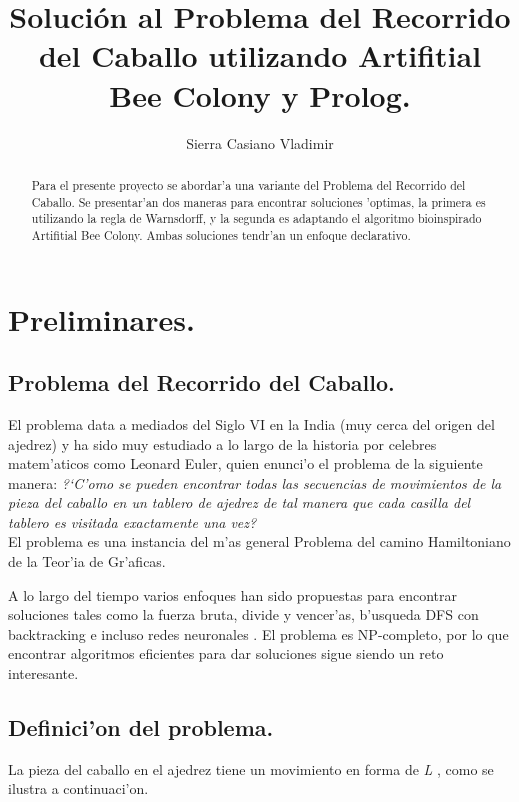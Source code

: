 \documentclass[12pt]{article}
\title{Solución al Problema del Recorrido del Caballo
    utilizando Artifitial Bee Colony y Prolog.}
\author{Sierra Casiano Vladimir}
\begin{document}
    \maketitle

    \begin{abstract}
        Para el presente proyecto se abordar'a una variante del Problema del Recorrido del
        Caballo.
        Se presentar'an dos maneras para encontrar soluciones
        'optimas, la primera es utilizando la regla de Warnsdorff, y la segunda
        es adaptando el algoritmo bioinspirado Artifitial Bee Colony. Ambas
        soluciones tendr'an un enfoque declarativo.
    \end{abstract}


    \section{Preliminares.}

    \subsection{Problema del Recorrido del Caballo.}


    El problema data a mediados del Siglo VI en la India \cite{watkins} (muy cerca del
    origen del ajedrez) y ha sido muy estudiado a lo largo de la historia por
    celebres matem'aticos como
    Leonard Euler, quien enunci'o el problema de la siguiente manera:
    \textit{ ?`C'omo se pueden encontrar todas las secuencias de movimientos de
    la pieza del caballo en un tablero de ajedrez de tal manera que cada casilla del
    tablero es visitada exactamente una vez?
    }  \cite{golumbic2021} \\
    El problema es una instancia del m'as general
    Problema del camino Hamiltoniano de la  Teor'ia de Gr'aficas.

    A lo largo del tiempo varios enfoques han sido propuestas para
    encontrar soluciones tales como la fuerza bruta, divide y vencer'as,
    b'usqueda DFS con backtracking e incluso redes neuronales \cite{anan}.
    El problema es NP-completo, por lo que encontrar algoritmos eficientes
    para dar soluciones sigue siendo un reto interesante.



    \subsection{Definici'on del problema.}
    La pieza del caballo en el ajedrez tiene un movimiento en forma de \textit{L} , como
    se ilustra a continuaci'on.
    
\end{document}
